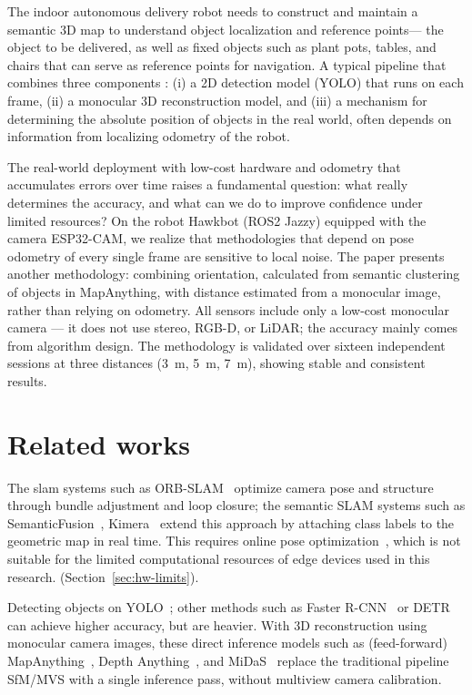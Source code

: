 \documentclass[conference]{IEEEtran}
\begin{document}
The indoor autonomous delivery robot needs to construct and maintain a semantic 3D map to understand object localization and reference points— the object to be delivered, as well as fixed objects such as plant pots, tables, and chairs that can serve as reference points for navigation. A typical pipeline that combines three components  : (i) a 2D detection model (YOLO) that runs on each frame, (ii) a monocular 3D reconstruction model, and (iii) a mechanism for determining the absolute position of objects in the real world, often depends on information from localizing odometry of the robot.

The real-world deployment with low-cost hardware and odometry that accumulates errors over time raises a fundamental question: what really determines the accuracy, and what can we do to improve confidence under limited resources? On the robot Hawkbot (ROS2 Jazzy) equipped with the camera ESP32-CAM, we realize that methodologies that depend on pose odometry of every single frame are sensitive to local noise. The paper presents another methodology: combining orientation, calculated from semantic clustering of objects in MapAnything, with distance estimated from a monocular image, rather than relying on odometry. All sensors include only a low-cost monocular camera — it does not use stereo, RGB-D, or LiDAR; the accuracy mainly comes from algorithm design. The methodology is validated over sixteen independent sessions at three distances (\SI{3}{\meter}, \SI{5}{\meter}, \SI{7}{\meter}), showing stable and consistent results.

\section{Related works}

The slam systems such as ORB-SLAM~\cite{7219438} optimize camera pose and structure through bundle adjustment and loop closure; the semantic SLAM systems such as SemanticFusion~\cite{7989538}, Kimera~\cite{9196885} extend this approach by attaching class labels to the geometric map in real time. This requires online pose optimization~\cite{7747236}, which is not suitable for the limited computational resources of edge devices used in this research. (Section~\ref{sec:hw-limits}).

Detecting objects on YOLO~\cite{7780460,yolo11}; other methods such as Faster R-CNN~\cite{7485869} or DETR~\cite{carion2020detr} can achieve higher accuracy, but are heavier. With 3D reconstruction using monocular camera images, these direct inference models such as (feed-forward) MapAnything~\cite{mapanything}, Depth Anything~\cite{10657693}, and MiDaS~\cite{9178977} replace the traditional pipeline SfM/MVS with a single inference pass, without multiview camera calibration.
\end{document}
